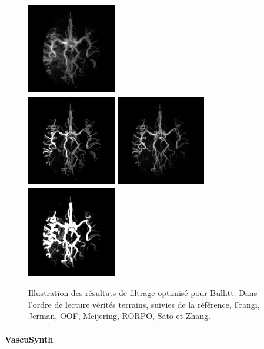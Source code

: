 \begin{figure}[!ht]
  \includegraphics[clip = true, trim = 90 20 90 20, height=4cm,width=3.9cm]{Images/Bullitt_Meijering.png}
  \\
  \includegraphics[clip = true, trim = 90 20 90 20, height=4cm,width=3.9cm]{Images/Bullitt_RORPO.png}
  \includegraphics[clip = true, trim = 90 20 90 20, height=4cm,width=3.9cm]{Images/Bullitt_Sato.png}
  \includegraphics[clip = true, trim = 90 20 90 20, height=4cm,width=3.9cm]{Images/Bullitt_Zhang.png}
  \caption{Illustration des résultats de filtrage optimisé pour Bullitt.
  Dans l'ordre de lecture vérités terrains, suivies de la référence, Frangi, Jerman, OOF, Meijering, RORPO, Sato et Zhang.}
  \label{fig:qualitative results VascuSynth}
\end{figure}

\paragraph{VascuSynth}


